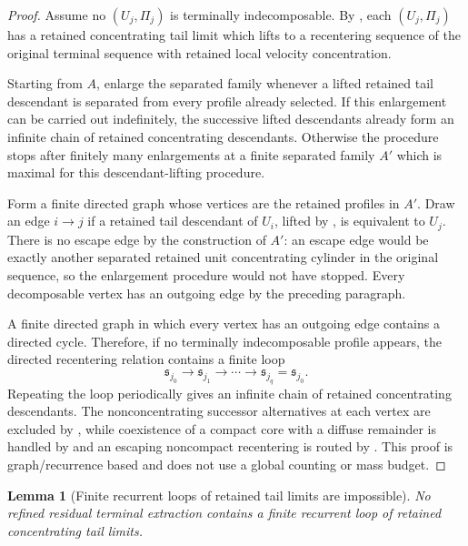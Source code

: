 \documentclass[11pt]{amsart}
\numberwithin{equation}{section}
\theoremstyle{plain}
\newtheorem{lemma}[lemma]{Lemma}
\theoremstyle{definition}
\theoremstyle{remark}
\begin{document}
\begin{proof}
Assume no \((U_j,\Pi_j)\) is terminally indecomposable.  By
, each
\((U_j,\Pi_j)\) has a retained concentrating tail limit which lifts to a
recentering sequence of the original terminal sequence with retained local
velocity concentration.

Starting from \(A\), enlarge the separated family whenever a lifted retained
tail descendant is separated from every profile already selected.  If this
enlargement can be carried out indefinitely, the successive lifted descendants
already form an infinite chain of retained concentrating descendants.  Otherwise the procedure
stops after finitely many enlargements at a finite separated family \(A'\)
which is maximal for this descendant-lifting procedure.

Form a finite directed graph whose vertices are the retained profiles in
\(A'\).  Draw an edge \(i\to j\) if a retained tail descendant of \(U_i\),
lifted by , is equivalent to \(U_j\).
There is no escape edge by the construction of \(A'\): an escape edge would be
exactly another separated retained unit concentrating cylinder in the original
sequence, so the enlargement procedure would not have stopped.  Every
decomposable vertex has an outgoing edge by the preceding paragraph.

A finite directed graph in which every vertex has an outgoing edge contains a
directed cycle.  Therefore, if no terminally indecomposable profile appears, the
directed recentering relation contains a finite loop
\[
   \mathfrak s_{j_0}\to\mathfrak s_{j_1}\to\cdots
   \to\mathfrak s_{j_q}=\mathfrak s_{j_0}.
\]
Repeating the loop periodically gives an infinite chain of retained concentrating descendants.  The
nonconcentrating successor alternatives at each vertex are excluded by
, while coexistence of a compact core with a
diffuse remainder is handled by  and an
escaping noncompact recentering is routed by
.  This proof is graph/recurrence based and
does not use a global counting or mass budget.
\end{proof}

\begin{lemma}[Finite recurrent loops of retained tail limits are impossible]
\label{lem:no-finite-recurrent-cycle}
No refined residual terminal extraction contains a finite recurrent loop of
retained concentrating tail limits.
\end{lemma}
\end{document}
